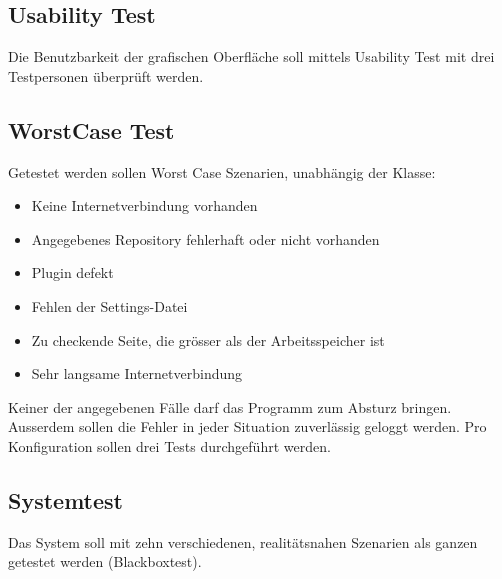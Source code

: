 \subsection{Usability Test}
Die Benutzbarkeit der grafischen Oberfläche soll mittels Usability Test mit drei Testpersonen überprüft werden.

\subsection{WorstCase Test}
Getestet werden sollen Worst Case Szenarien, unabhängig der Klasse: 
\begin{itemize}
	\setlength{\itemsep}{-\parsep}
	\item Keine Internetverbindung vorhanden
	\item Angegebenes Repository fehlerhaft oder nicht vorhanden
	\item Plugin defekt
	\item Fehlen der Settings-Datei
	\item Zu checkende Seite, die grösser als der Arbeitsspeicher ist
	\item Sehr langsame Internetverbindung
\end{itemize}
Keiner der angegebenen Fälle darf das Programm zum Absturz bringen. Ausserdem sollen die Fehler in jeder Situation zuverlässig geloggt werden.
Pro Konfiguration sollen drei Tests durchgeführt werden.

\subsection{Systemtest}
Das System soll mit zehn verschiedenen, realitätsnahen Szenarien als ganzen getestet werden (Blackboxtest). 
